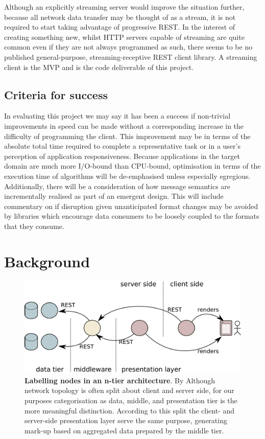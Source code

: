 \documentclass[12pt, ]{article}
\makeatletter
\let\stdsection\section
\renewcommand\section{\newpage\stdsection}
\def\maxwidth{\ifdim\Gin@nat@width>\linewidth\linewidth
\else\Gin@nat@width\fi}
\let\Oldincludegraphics\includegraphics
\renewcommand{\includegraphics}[1]{\Oldincludegraphics[width=\maxwidth]{#1}}
\makeatother
\begin{document}
Although an explicitly streaming server would improve the situation
further, because all network data transfer may be thought of as a
stream, it is not required to start taking advantage of progressive
REST. In the interest of creating something new, whilst HTTP servers
capable of streaming are quite common even if they are not always
programmed as such, there seems to be no published general-purpose,
streaming-receptive REST client library. A streaming client is the MVP
and is the code deliverable of this project.

\subsection{Criteria for success}\label{criteria-for-success}

In evaluating this project we may say it has been a success if
non-trivial improvements in speed can be made without a corresponding
increase in the difficulty of programming the client. This improvement
may be in terms of the absolute total time required to complete a
representative task or in a user's perception of application
responsiveness. Because applications in the target domain are much more
I/O-bound than CPU-bound, optimisation in terms of the execution time of
algorithms will be de-emphasised unless especially egregious.
Additionally, there will be a consideration of how message semantics are
incrementally realised as part of an emergent design. This will include
commentary on if disruption given unanticipated format changes may be
avoided by libraries which encourage data consumers to be loosely
coupled to the formats that they consume.

\section{Background}\label{background}

\begin{figure}[htbp]
\centering
\includegraphics{images/architecture.png}
\caption{\textbf{Labelling nodes in an n-tier architecture}. By Although
network topology is often split about client and server side, for our
purposes categorisation as data, middle, and presentation tier is the
more meaningful distinction. According to this split the client- and
server-side presentation layer serve the same purpose, generating
mark-up based on aggregated data prepared by the middle tier.
\label{architecture}}
\end{figure}
\end{document}
